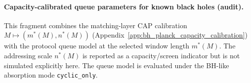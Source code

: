 \paragraph{Capacity-calibrated queue parameters for known black holes (audit).} \AuditTag This fragment combines the matching-layer CAP calibration $M\mapsto(m^\ast(M),n^\ast(M))$ (Appendix~\ref{app:bh_planck_capacity_calibration}) with the protocol queue model at the selected window length $m^\ast(M)$. The addressing scale $n^\ast(M)$ is reported as a capacity/screen indicator but is not simulated explicitly here. The queue model is evaluated under the BH-like absorption mode \texttt{cyclic\_only}.